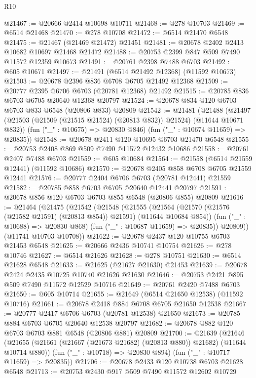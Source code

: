\begin{lexlean}{R10}
\begin{coremodule}
@21467 := @20666 @2414 @10698 @10711
@21468 := @278 @10703
@21469 := @6514 @21468
@21470 := @278 @10708
@21472 := @6514 @21470 @6548
@21475 := @21467 (@21469 @21472) @21451
@21481 := @20678 @2402 @2413 @10682 @10697 @21468 @21472
@21488 := @20753 @2399 @847 @509 @7490 @11572 @12359 @10673
@21491 := @20761 @2398 @7488 @6703
@21492 := @605 @10671
@21497 := @21491 (@6514 @21492 @12368) (@11592 @10673)
@21503 := @20678 @2396 @836 @6708 @6705 @21492 @12368
@21509 := @20777 @2395 @6706 @6703 (@20781 @12368) @21492
@21515 := @20785 @836 @6703 @6705 @20640 @12368 @20797
@21524 := @20678 @834 @120 @6703 @6703 @833 @6548 (@20806 @833) @20809
@21542 := @21481
    (@21488
      (@21497 (@21503 (@21509 (@21515 @21524) (@20813 @832)) @21524) (@11644 @10671 @832))
      (fun ("_" : @10675) => @20830 @846)
      (fun ("_" : @10674 @11659) => @20835))
@21548 := @20678 @2411 @120 @10695 @6703 @21470 @6548
@21555 := @20753 @2408 @869 @509 @7490 @11572 @12432 @10686
@21558 := @20761 @2407 @7488 @6703
@21559 := @605 @10684
@21564 := @21558 (@6514 @21559 @12441) (@11592 @10686)
@21570 := @20678 @2405 @858 @6708 @6705 @21559 @12441
@21576 := @20777 @2404 @6706 @6703 (@20781 @12441) @21559
@21582 := @20785 @858 @6703 @6705 @20640 @12441 @20797
@21591 := @20678 @856 @120 @6703 @6703 @855 @6548 (@20806 @855) @20809
@21616 := @21464
    (@21475
      (@21542
        (@21548
          (@21555
            (@21564 (@21570 (@21576 (@21582 @21591) (@20813 @854)) @21591) (@11644 @10684 @854))
            (fun ("_" : @10688) => @20830 @868)
            (fun ("_" : @10687 @11659) => @20835))
          @20809))
      (@11741 @10703 @10708))
@21622 := @20678 @2437 @120 @10755 @6703 @21453 @6548
@21625 := @20666 @2436 @10741 @10754
@21626 := @278 @10746
@21627 := @6514 @21626
@21628 := @278 @10751
@21630 := @6514 @21628 @6548
@21633 := @21625 (@21627 @21630) @21453
@21639 := @20678 @2424 @2435 @10725 @10740 @21626 @21630
@21646 := @20753 @2421 @895 @509 @7490 @11572 @12529 @10716
@21649 := @20761 @2420 @7488 @6703
@21650 := @605 @10714
@21655 := @21649 (@6514 @21650 @12538) (@11592 @10716)
@21661 := @20678 @2418 @884 @6708 @6705 @21650 @12538
@21667 := @20777 @2417 @6706 @6703 (@20781 @12538) @21650
@21673 := @20785 @884 @6703 @6705 @20640 @12538 @20797
@21682 := @20678 @882 @120 @6703 @6703 @881 @6548 (@20806 @881) @20809
@21700 := @21639
    (@21646
      (@21655 (@21661 (@21667 (@21673 @21682) (@20813 @880)) @21682) (@11644 @10714 @880))
      (fun ("_" : @10718) => @20830 @894)
      (fun ("_" : @10717 @11659) => @20835))
@21706 := @20678 @2433 @120 @10738 @6703 @21628 @6548
@21713 := @20753 @2430 @917 @509 @7490 @11572 @12602 @10729

\end{coremodule}
\end{lexlean}
